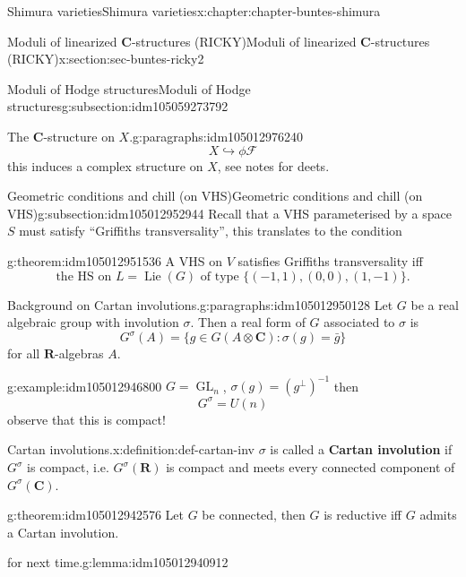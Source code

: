 \documentclass[oneside,10pt,]{book}
\newcommand{\terminology}[1]{\textbf{#1}}
\numberwithin{equation}{section}
\DeclareMathOperator{\Lie}{Lie}
\newcommand{\inv}{^{-1}}
\newcommand{\RR}{\mathbf{R}}
\newcommand{\CC}{\mathbf{C}}
\DeclareMathOperator{\GL}{GL}
\begin{document}
\begin{chapterptx}{Shimura varieties}{}{Shimura varieties}{}{}{x:chapter:chapter-buntes-shimura}
\begin{sectionptx}{Moduli of linearized \(\CC\)-structures (RICKY)}{}{Moduli of linearized \(\CC\)-structures (RICKY)}{}{}{x:section:sec-buntes-ricky2}
\begin{subsectionptx}{Moduli of Hodge structures}{}{Moduli of Hodge structures}{}{}{g:subsection:idm105059273792}
\begin{paragraphs}{The \(\CC\)-structure on \(X\).}{g:paragraphs:idm105012976240}
\begin{equation*}
X \hookrightarrow \phi \mathcal F
\end{equation*}
this induces a complex structure on \(X\), see notes for deets.%
\end{paragraphs}%
\end{subsectionptx}
%
%
\typeout{************************************************}
\typeout{************************************************}
%
\begin{subsectionptx}{Geometric conditions and chill (on VHS)}{}{Geometric conditions and chill (on VHS)}{}{}{g:subsection:idm105012952944}
Recall that a VHS parameterised by a space \(S\) must satisfy ``Griffiths transversality'', this translates to the condition%
\begin{theorem}{}{}{g:theorem:idm105012951536}%
A VHS on \(V\) satisfies Griffiths transversality iff%
\begin{equation}
\text{the HS  on } L = \Lie(G) \text{ of type }\{(-1,1),(0,0),(1,-1)\}\text{.}\label{g:men:idm105012950640}
\end{equation}
%
\end{theorem}
\begin{paragraphs}{Background on Cartan involutions.}{g:paragraphs:idm105012950128}%
Let \(G\) be a real algebraic group with involution \(\sigma\). Then a real form of \(G\)  associated to \(\sigma\) is%
\begin{equation*}
G^\sigma (A) = \{ g \in G(A \otimes \CC) : \sigma(g) = \bar g\}
\end{equation*}
for all \(\RR\)-algebras \(A\).%
\begin{example}{}{g:example:idm105012946800}%
\(G = \GL_n\), \(\sigma(g) = (g^\perp)\inv\) then%
\begin{equation*}
G^\sigma = U(n)
\end{equation*}
observe that this is compact!%
\end{example}
\begin{definition}{Cartan involutions.}{x:definition:def-cartan-inv}%
\(\sigma\) is called a \terminology{Cartan involution} if \(G^\sigma\) is compact, i.e. \(G^\sigma(\RR)\) is compact and meets every connected component of \(G^\sigma(\CC)\).%
\end{definition}
\begin{theorem}{}{}{g:theorem:idm105012942576}%
Let \(G\) be connected, then \(G\) is reductive iff \(G\) admits a Cartan involution.%
\end{theorem}
\begin{lemma}{for next time.}{}{g:lemma:idm105012940912}%

\end{lemma}
\end{paragraphs}
\end{subsectionptx}
\end{sectionptx}
\end{chapterptx}
\end{document}
